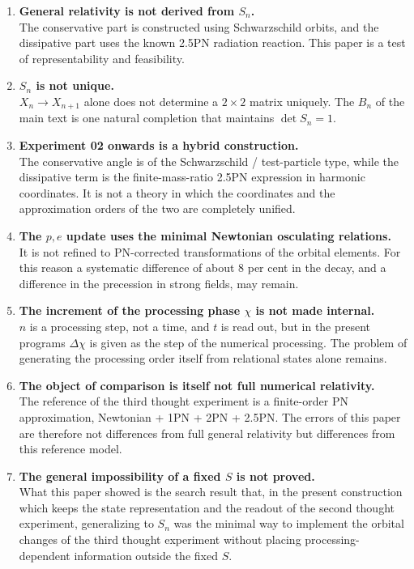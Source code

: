 \documentclass[
  a4paper,
]{article}
\begin{document}
\begin{enumerate}
\def\labelenumi{\arabic{enumi}.}
\item
  \textbf{General relativity is not derived from \(S_n\).}\\
  The conservative part is constructed using Schwarzschild orbits, and
  the dissipative part uses the known 2.5PN radiation reaction. This
  paper is a test of representability and feasibility.
\item
  \textbf{\(S_n\) is not unique.}\\
  \(X_n\rightarrow X_{n+1}\) alone does not determine a \(2\times2\)
  matrix uniquely. The \(B_n\) of the main text is one natural
  completion that maintains \(\det S_n=1\).
\item
  \textbf{Experiment 02 onwards is a hybrid construction.}\\
  The conservative angle is of the Schwarzschild / test-particle type,
  while the dissipative term is the finite-mass-ratio 2.5PN expression
  in harmonic coordinates. It is not a theory in which the coordinates
  and the approximation orders of the two are completely unified.
\item
  \textbf{The \(p,e\) update uses the minimal Newtonian osculating
  relations.}\\
  It is not refined to PN-corrected transformations of the orbital
  elements. For this reason a systematic difference of about 8 per cent
  in the decay, and a difference in the precession in strong fields, may
  remain.
\item
  \textbf{The increment of the processing phase \(\chi\) is not made
  internal.}\\
  \(n\) is a processing step, not a time, and \(t\) is read out, but in
  the present programs \(\Delta\chi\) is given as the step of the
  numerical processing. The problem of generating the processing order
  itself from relational states alone remains.
\item
  \textbf{The object of comparison is itself not full numerical
  relativity.}\\
  The reference of the third thought experiment is a finite-order PN
  approximation, Newtonian + 1PN + 2PN + 2.5PN. The errors of this paper
  are therefore not differences from full general relativity but
  differences from this reference model.
\item
  \textbf{The general impossibility of a fixed \(S\) is not proved.}\\
  What this paper showed is the search result that, in the present
  construction which keeps the state representation and the readout of
  the second thought experiment, generalizing to \(S_n\) was the minimal
  way to implement the orbital changes of the third thought experiment
  without placing processing-dependent information outside the fixed
  \(S\).
\end{enumerate}
\end{document}
